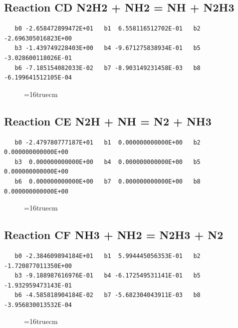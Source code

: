 \documentclass[12pt,dvipdfm]{article}
\begin{document}
\subsection{
Reaction CD N2H2 + NH2 = NH + N2H3 }
\begin{small}\begin{verbatim}
   b0 -2.658472899472E+01   b1  6.558116512702E-01   b2 -2.696305016823E+00
   b3 -1.439749228403E+00   b4 -9.671275838934E-01   b5 -3.028600118026E-01
   b6 -7.185154082033E-02   b7 -8.903149231458E-03   b8 -6.199641512105E-04
\end{verbatim}\end{small}
\begin{figure}[h!] \label{n2rates}
\epsfxsize=16truecm
\end{figure}
\newpage

\subsection{
Reaction CE N2H + NH = N2 + NH3 }
\begin{small}\begin{verbatim}
   b0 -2.479780777187E+01   b1  0.000000000000E+00   b2  0.000000000000E+00
   b3  0.000000000000E+00   b4  0.000000000000E+00   b5  0.000000000000E+00
   b6  0.000000000000E+00   b7  0.000000000000E+00   b8  0.000000000000E+00
\end{verbatim}\end{small}
\begin{figure}[h!] \label{n2rates}
\epsfxsize=16truecm
\end{figure}
\newpage

\subsection{
Reaction CF NH3 + NH2 = N2H3 + N2 }
\begin{small}\begin{verbatim}
   b0 -2.384609894184E+01   b1  5.994445056353E-01   b2 -1.720877011350E+00
   b3 -9.188987616976E-01   b4 -6.172549531141E-01   b5 -1.932959473143E-01
   b6 -4.585818904184E-02   b7 -5.682304043911E-03   b8 -3.956830013532E-04
\end{verbatim}\end{small}
\begin{figure}[h!] \label{n2rates}
\epsfxsize=16truecm
\end{figure}
\newpage
\end{document}
